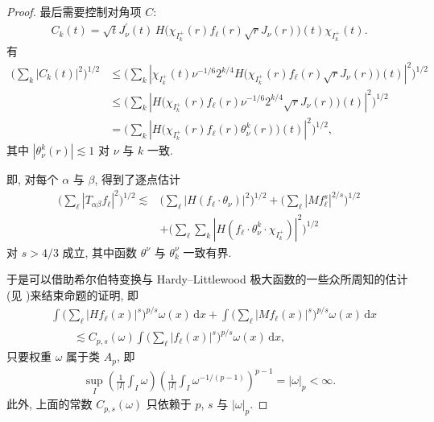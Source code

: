 \begin{proof}
最后需要控制对角项 $C$:
\begin{align*}
  C_{k}(t)=\sqrt{t}J_{\nu}^{\prime}(t)\,H\bigl(\chi_{I_{k}^{+}}(r)f_{\ell}(r)\sqrt{r}J_{\nu}(r)\bigr)(t)\chi_{I_{k}^{+}}(t).
\end{align*}
有
\begin{align*}
  \Big(\sum_{k}|C_{k}(t)|^{2}\Big)^{1/2}
  &\leq\Big(\sum_{k}|\chi_{I_{k}^{+}}(t)\nu^{-1/6}2^{k/4}
   H\bigl(\chi_{I_{k}^{+}}(r)f_{\ell}(r)\sqrt{r}J_{\nu}(r)\bigr)(t)|^{2}\Big)^{1/2}\\
  &\leq\Big(\sum_{k}|H\bigl(\chi_{I_{k}^{+}}(r)f_{\ell}(r)\nu^{-1/6}2^{k/4}\sqrt{r}J_{\nu}(r)\bigr)(t)|^{2}\Big)^{1/2}\\
  &=\Big(\sum_{k}|H\bigl(\chi_{I_{k}^{+}}(r)f_{\ell}(r)\theta_{\nu}^{k}(r)\bigr)(t)|^{2}\Big)^{1/2},
\end{align*}
其中 $|\theta_{\nu}^{k}(r)| \lesssim 1$ 对 $\nu$ 与 $k$ 一致.

即, 对每个 $\alpha$ 与 $\beta$, 得到了逐点估计
\begin{align*}
  \Big(\sum_{\ell}|T_{\alpha\beta}f_{\ell}|^{2}\Big)^{1/2}
  \lesssim&\Big(\sum_{\ell}|H(f_{\ell}\cdot\theta_{\nu})|^{2}\Big)^{1/2}
  +\Big(\sum_{\ell}|M f_{\ell}^{s}|^{2/s}\Big)^{1/2}\\
  &+\Big(\sum_{\ell}\sum_{k}|H(f_{\ell}\cdot\theta_{\nu}^{k}\cdot\chi_{I_{k}^{+}})|^{2}\Big)^{1/2}
\end{align*}
对 $s > 4/3$ 成立, 其中函数 $\theta^{\nu}$ 与 $\theta_{k}^{\nu}$ 一致有界.

于是可以借助希尔伯特变换与 Hardy--Littlewood 极大函数的一些众所周知的估计(见 \cite{b4,b139,b141})来结束命题的证明, 即
\begin{align*}
  &\int\Big(\sum_{\ell}|H f_{\ell}(x)|^{s}\Big)^{p/s}\omega(x)\,\mathrm{d}x
  +\int\Big(\sum_{\ell}|M f_{\ell}(x)|^{s}\Big)^{p/s}\omega(x)\,\mathrm{d}x\\
  &\qquad\lesssim C_{p,s}(\omega)\int\Big(\sum_{\ell}|f_{\ell}(x)|^{s}\Big)^{p/s}\omega(x)\,\mathrm{d}x,
\end{align*}
只要权重 $\omega$ 属于类 $A_{p}$, 即
\begin{align*}
  \sup_{I}\left(\frac{1}{|I|}\int_{I}\omega\right)
  \left(\frac{1}{|I|}\int_{I}\omega^{-1/(p-1)}\right)^{p-1}=|\omega|_{p}<\infty.
\end{align*}
此外, 上面的常数 $C_{p,s}(\omega)$ 只依赖于 $p$, $s$ 与 $|\omega|_{p}$.
\end{proof}

